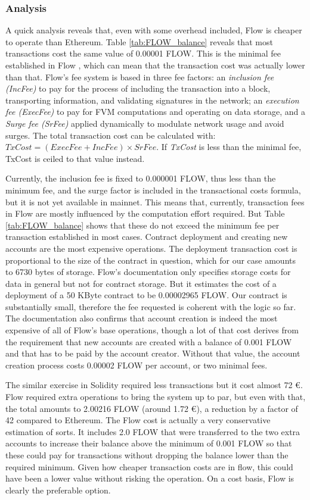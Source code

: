 \documentclass[../NFTComp_IEEE.tex]{subfiles}
\begin{document}
\subsubsection{Analysis}
A quick analysis reveals that, even with some overhead included, Flow is cheaper to operate than Ethereum. Table \ref{tab:FLOW_balance} reveals that most transactions cost the same value of 0.00001 FLOW. This is the minimal fee established in Flow \cite{flow2024d}, which can mean that the transaction cost was actually lower than that. Flow's fee system is based in three fee factors: an \textit{inclusion fee (IncFee)} to pay for the process of including the transaction into a block, transporting information, and validating signatures in the network; an \textit{execution fee (ExecFee)} to pay for FVM computations and operating on data storage, and a \textit{Surge fee (SrFee)} applied dynamically to modulate network usage and avoid surges. The total transaction cost can be calculated with: $ TxCost = (ExecFee + IncFee) \times SrFee $. If \textit{TxCost} is less than the minimal fee, TxCost is ceiled to that value instead.
\par
Currently, the inclusion fee is fixed to 0.000001 FLOW, thus less than the minimum fee, and the surge factor is included in the transactional costs formula, but it is not yet available in mainnet. This means that, currently, transaction fees in Flow are mostly influenced by the computation effort required. But Table \ref{tab:FLOW_balance} shows that these do not exceed the minimum fee per transaction established in most cases. Contract deployment and creating new accounts are the most expensive operations. The deployment transaction cost is proportional to the size of the contract in question, which for our case amounts to 6730 bytes of storage. Flow's documentation only specifies storage costs for data in general but not for contract storage. But it estimates the cost of a deployment of a 50 KByte contract to be 0.00002965 FLOW. Our contract is substantially small, therefore the fee requested is coherent with the logic so far. The documentation also confirms that account creation is indeed the most expensive of all of Flow's base operations, though a lot of that cost derives from the requirement that new accounts are created with a balance of 0.001 FLOW and that has to be paid by the account creator. Without that value, the account creation process costs 0.00002 FLOW per account, or two minimal fees.
\par
The similar exercise in Solidity required less transactions but it cost almost 72 €. Flow required extra operations to bring the system up to par, but even with that, the total amounts to 2.00216 FLOW (around 1.72 €), a reduction by a factor of 42 compared to Ethereum. The Flow cost is actually a very conservative estimation of sorts. It includes 2.0 FLOW that were transferred to the two extra accounts to increase their balance above the minimum of 0.001 FLOW so that these could pay for transactions without dropping the balance lower than the required minimum. Given how cheaper transaction costs are in flow, this could have been a lower value without risking the operation. On a cost basis, Flow is clearly the preferable option.
\end{document}

